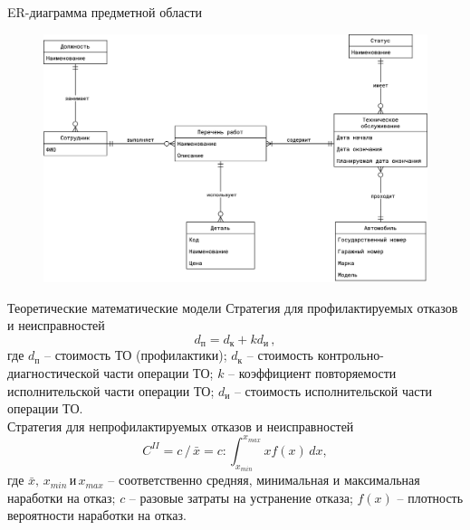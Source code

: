 \documentclass{beamer}
\begin{document}
\begin{frame}
	{ER-диаграмма предметной области}
    \begin{figure}[h]
        \centering
        \includegraphics[keepaspectratio,width=\textwidth]{presentation/images/er-diagram.png}
        \label{fig:er-diagram}
    \end{figure}
\end{frame}

\begin{frame}
	{Теоретические математические модели}
    Стратегия для профилактируемых отказов и неисправностей
    \begin{equation*}
        d_{\text{п}} = d_{\text{к}} + k d_{\text{и}}\,,
    \end{equation*}
    {\footnotesize
        где $d_{\text{п}}$ -- стоимость ТО (профилактики); $d_{\text{к}}$ --
        стоимость контрольно-диагностической части операции ТО; $k$ --
        коэффициент повторяемости исполнительской части операции ТО;
        $d_{\text{и}}$ -- стоимость исполнительской части операции ТО.
    }
    \\[\baselineskip]
    Стратегия для непрофилактируемых отказов и неисправностей
    \begin{equation*}
        C^{II} =
        c\,/\,\bar{x} =
        c : \int_{x_{min}}^{x_{max}} x f(x)\,dx,
    \end{equation*}
    {\footnotesize
        где $\bar{x},\,x_{min} \,\text{и} \,x_{max}$ -- соответственно средняя,
        минимальная и максимальная наработки на отказ; $c$ -- разовые затраты на
        устранение отказа; $f(x)$ -- плотность вероятности наработки на отказ.
    }
\end{frame}
\end{document}
